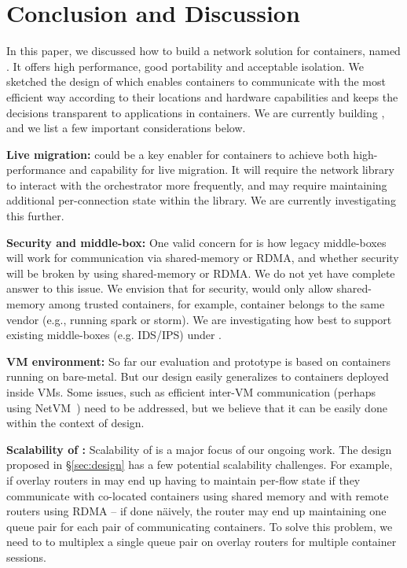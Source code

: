 \section{Conclusion and Discussion} \label{sec:discussion}

In this paper, we discussed how to build a network solution for containers,
named \sysname. It offers high performance, good portability and acceptable
isolation. We sketched the design of \sysname which enables containers to
communicate with the most efficient way according to their locations and
hardware capabilities and keeps the decisions transparent to applications in
containers. We are currently building \sysname, and we list a few important
considerations below.

\textbf{Live migration:} 
\sysname could be a key enabler
for containers to achieve both high-performance and capability for live
migration. It will require the network library to interact with the orchestrator
more frequently, and may require maintaining additional per-connection state
within the library. We are currently investigating this further.

\textbf{Security and middle-box:} One valid concern for \sysname is how legacy
middle-boxes will work for communication via shared-memory or RDMA, and whether
security will be broken by using shared-memory or RDMA.  We do not yet have
complete answer to this issue. We envision that for security, \sysname would
only allow shared-memory among trusted containers, for example, container
belongs to the same vendor (e.g., running spark or storm).  We are investigating
how best to support existing middle-boxes (e.g. IDS/IPS) under \sysname.


\textbf{VM environment:}
So far our evaluation and prototype is based on containers running on
bare-metal.  But our design easily generalizes to containers deployed inside
VMs. Some issues, such as efficient inter-VM communication (perhaps using
NetVM~\cite{netvm}) need to be addressed, but we believe that it can be easily
done within the context of \sysname design.


\textbf{Scalability of \sysname :}
Scalability of \sysname is a major focus of our ongoing work. The design proposed
in \S\ref{sec:design} has a few potential scalability challenges. For example,
if overlay routers in \sysname may end up having to maintain per-flow state if
they communicate with co-located containers using shared memory and with remote
routers using RDMA -- if done n\"{a}ively, the router may end up maintaining
one queue pair for each pair of communicating containers.  To solve this
problem, we need to to multiplex a single queue pair on overlay routers for
multiple container sessions.



